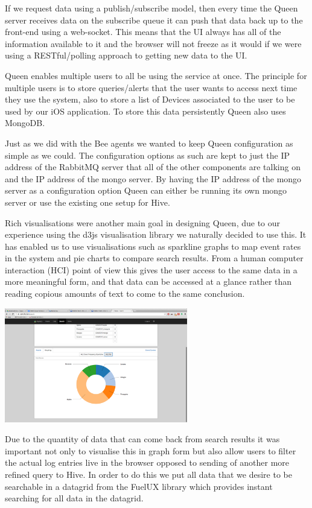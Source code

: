 If we request data using a publish/subscribe model, then
every time the Queen
server receives data on the subscribe queue it can push
that data back up to the
front-end using a web-socket. This means that the UI
always has all of the
information available to it and the browser will not
freeze as it would if we
were using a RESTful/polling approach to getting new
data to the UI.

Queen enables multiple users to all be using the service
at once. The principle
for multiple users is to store queries/alerts that the
user wants to access next
time they use the system, also to store a list of
Devices associated to the user
to be used by our iOS application. To store this data
persistently Queen also uses
MongoDB.

Just as we did with the Bee agents we wanted to keep
Queen configuration as
simple as we could. The configuration options as such
are kept to just the IP
address of the RabbitMQ server that all of the other
components are talking on and
the IP address of the mongo server. By having the IP
address of the mongo server
as a configuration option Queen can either be running
its own mongo server or
use the existing one setup for Hive.

Rich visualisations were another main goal in designing
Queen, due to our
experience using the d3js\cite{d3} visualisation library we
naturally decided to use
this. It has enabled us to use visualisations such as
sparkline graphs to map
event rates in the system and pie charts to compare search
results. From a
human computer interaction (HCI) point of view this gives
the user access to the
same data in a more meaningful form, and that data can be
accessed at a glance
rather than reading copious amounts of text to come to the
same conclusion.

\vspace{10 mm}
\graphicspath{{./pics/}}
\includegraphics[width=8cm, keepaspectratio]{search.png}
\vspace{10 mm}

Due to the quantity of data that can come back from search
results it was
important not only to visualise this in graph form but
also allow users to
filter the actual log entries live in the browser opposed
to sending of another
more refined query to Hive. In order to do this we put all
data that we desire
to be searchable in a datagrid from the FuelUX\cite{fuelux} library
which provides instant
searching for all data in the datagrid.

